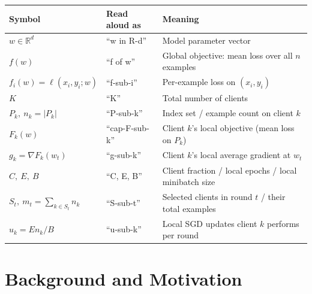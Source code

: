 \documentclass[11pt]{article}
\begin{document}
\begin{tabular}{lll}
\toprule
Symbol & Read aloud as & Meaning \\
\midrule
$w \in \mathbb{R}^d$ & ``w in R-d'' & Model parameter vector \\ %
$f(w)$ & ``f of w'' & Global objective: mean loss over all $n$ examples \\ %
$f_i(w)=\ell(x_i,y_i;w)$ & ``f-sub-i'' & Per-example loss on $(x_i,y_i)$ \\ %
$K$ & ``K'' & Total number of clients \\ %
$P_k,\ n_k=|P_k|$ & ``P-sub-k'' & Index set / example count on client $k$ \\ %
$F_k(w)$ & ``cap-F-sub-k'' & Client $k$'s local objective (mean loss on $P_k$) \\ %
$g_k=\nabla F_k(w_t)$ & ``g-sub-k'' & Client $k$'s local average gradient at $w_t$ \\ %
$C,\ E,\ B$ & ``C, E, B'' & Client fraction / local epochs / local minibatch size \\ %
$S_t,\ m_t=\sum_{k\in S_t} n_k$ & ``S-sub-t'' & Selected clients in round $t$ / their total examples \\ %
$u_k=En_k/B$ & ``u-sub-k'' & Local SGD updates client $k$ performs per round \\ %
\bottomrule
\end{tabular}

\section{Background and Motivation}
\end{document}
